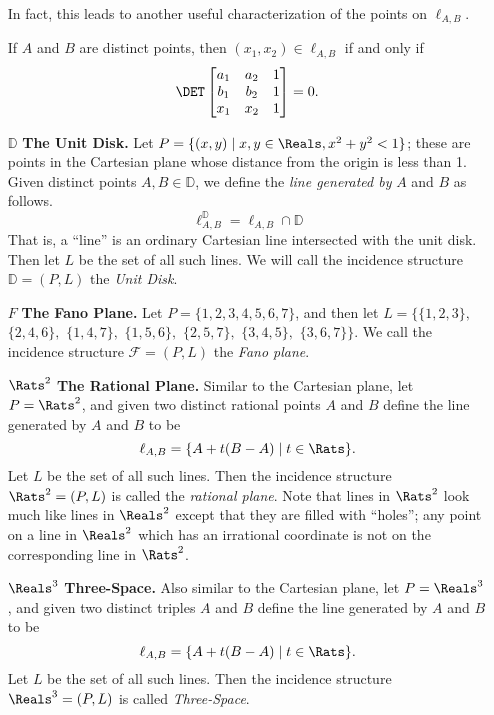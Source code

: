 \documentclass{article}
\begin{document}
\begin{itemize}
In fact, this leads to another useful characterization of the points on $\ell_{A,B}$.

\begin{cor}
If $A$ and $B$ are distinct points, then $(x_1,x_2) \in \ell_{A,B}$ if and only if \[ \DET \begin{bmatrix} a_1 & a_2 & 1 \\ b_1 & b_2 & 1 \\ x_1 & x_2 & 1 \end{bmatrix} = 0. \]
\end{cor}


\item[$\mathbb{D}$] \textbf{The Unit Disk.} Let $P = \{ (x,y) \mid x,y \in \Reals, x^2 + y^2 < 1 \}$; these are points in the Cartesian plane whose distance from the origin is less than 1. Given distinct points $A,B \in \mathbb{D}$, we define the \emph{line generated by} $A$ and $B$ as follows. \[ \ell_{A,B}^\mathbb{D} = \ell_{A,B} \cap \mathbb{D} \] That is, a ``line'' is an ordinary Cartesian line intersected with the unit disk. Then let $L$ be the set of all such lines. We will call the incidence structure $\mathbb{D} = (P,L)$ the \emph{Unit Disk}.


\item[$F$] \textbf{The Fano Plane.} Let $P = \{1,2,3,4,5,6,7\}$, and then let $L = \{\{1,2,3\},$ $\{2,4,6\},$ $\{1,4,7\},$ $\{1,5,6\},$ $\{2,5,7\},$ $\{3,4,5\},$ $\{3,6,7\}\}$. We call the incidence structure $\mathcal{F} = (P,L)$ the \emph{Fano plane}.


\item[$\Rats^2$] \textbf{The Rational Plane.} Similar to the Cartesian plane, let $P = \Rats^2$, and given two distinct rational points $A$ and $B$ define the line generated by $A$ and $B$ to be \[\ell_{A,B} = \{ A + t(B-A) \mid t \in \Rats \}. \] Let $L$ be the set of all such lines. Then the incidence structure $\Rats^2 = (P,L)$ is called the \emph{rational plane}. Note that lines in $\Rats^2$ look much like lines in $\Reals^2$ except that they are filled with ``holes''; any point on a line in $\Reals^2$ which has an irrational coordinate is not on the corresponding line in $\Rats^2$.


\item[$\Reals^3$] \textbf{Three-Space.} Also similar to the Cartesian plane, let $P = \Reals^3$, and given two distinct triples $A$ and $B$ define the line generated by $A$ and $B$ to be \[\ell_{A,B} = \{ A + t(B-A) \mid t \in \Rats \}. \] Let $L$ be the set of all such lines. Then the incidence structure $\Reals^3 = (P,L)$ is called \emph{Three-Space}.



\end{itemize}
\end{document}
